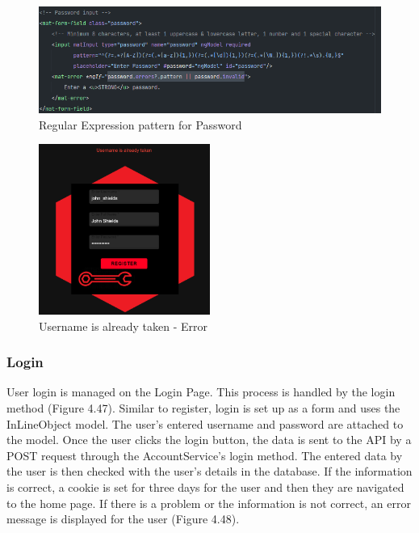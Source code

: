 \begin{figure}[H]
    \caption{Regular Expression pattern for Password}
    \label{image:passwordRegEx}
    \centering
    \includegraphics[width=1.0\textwidth]{images/repota/account_pages/password_regex.png}
\end{figure}

\begin{figure}[H]
    \caption{Username is already taken - Error}
    \label{image:nameTaken}
    \centering
    \includegraphics[width=0.5\textwidth]{images/repota/UI/username_taken.png}
\end{figure}

\subsubsection{Login}
User login is managed on the Login Page. This process is handled by the login method (Figure 4.47). Similar to register, login is set up as a form and uses the InLineObject model. The user's entered username and password are attached to the model. Once the user clicks the login button, the data is sent to the API by a POST request through the AccountService's login method. The entered data by the user is then checked with the user's details in the database. If the information is correct, a cookie is set for three days for the user and then they are navigated to the home page. If there is a problem or the information is not correct, an error message is displayed for the user (Figure 4.48). 

